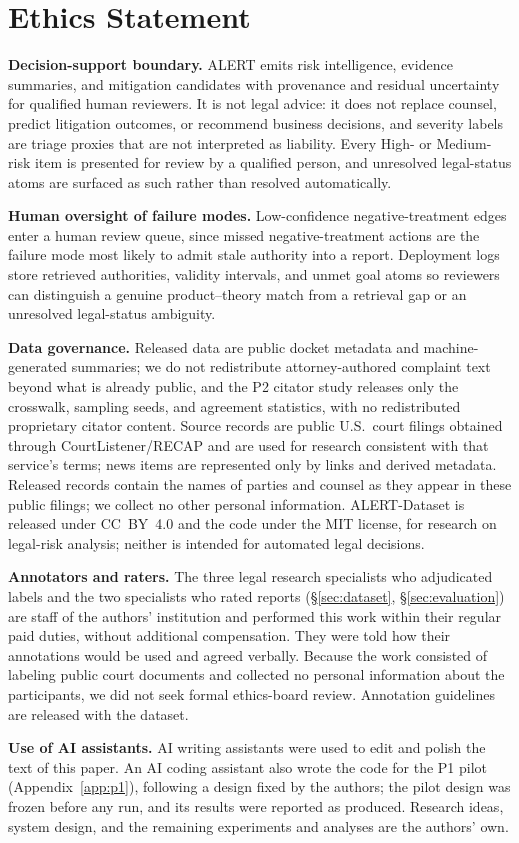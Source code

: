 \section*{Ethics Statement}
\label{sec:ethics}

\textbf{Decision-support boundary.} ALERT emits risk intelligence, evidence summaries, and mitigation candidates with provenance and residual uncertainty for qualified human reviewers. It is not legal advice: it does not replace counsel, predict litigation outcomes, or recommend business decisions, and severity labels are triage proxies that are not interpreted as liability. Every High- or Medium-risk item is presented for review by a qualified person, and unresolved legal-status atoms are surfaced as such rather than resolved automatically.

\textbf{Human oversight of failure modes.} Low-confidence negative-treatment edges enter a human review queue, since missed negative-treatment actions are the failure mode most likely to admit stale authority into a report. Deployment logs store retrieved authorities, validity intervals, and unmet goal atoms so reviewers can distinguish a genuine product--theory match from a retrieval gap or an unresolved legal-status ambiguity.

\textbf{Data governance.} Released data are public docket metadata and machine-generated summaries; we do not redistribute attorney-authored complaint text beyond what is already public, and the P2 citator study releases only the crosswalk, sampling seeds, and agreement statistics, with no redistributed proprietary citator content. Source records are public U.S.\ court filings obtained through CourtListener/RECAP and are used for research consistent with that service's terms; news items are represented only by links and derived metadata. Released records contain the names of parties and counsel as they appear in these public filings; we collect no other personal information. ALERT-Dataset is released under CC~BY~4.0 and the code under the MIT license, for research on legal-risk analysis; neither is intended for automated legal decisions.

\textbf{Annotators and raters.} The three legal research specialists who adjudicated labels and the two specialists who rated reports (\S\ref{sec:dataset}, \S\ref{sec:evaluation}) are staff of the authors' institution and performed this work within their regular paid duties, without additional compensation. They were told how their annotations would be used and agreed verbally. Because the work consisted of labeling public court documents and collected no personal information about the participants, we did not seek formal ethics-board review. Annotation guidelines are released with the dataset.

\textbf{Use of AI assistants.} AI writing assistants were used to edit and polish the text of this paper. An AI coding assistant also wrote the code for the P1 pilot (Appendix~\ref{app:p1}), following a design fixed by the authors; the pilot design was frozen before any run, and its results were reported as produced. Research ideas, system design, and the remaining experiments and analyses are the authors' own.
